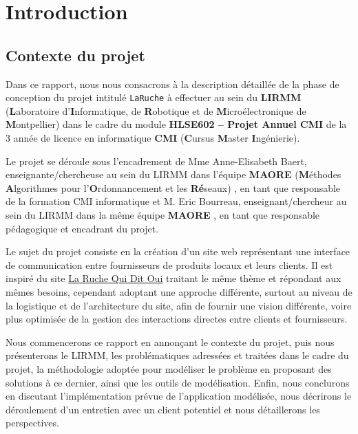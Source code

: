 \documentclass[a4paper,12pt]{report}
\theoremstyle{break}
\theoremstyle{break}
\theoremstyle{break}
\theoremstyle{break}
\theoremstyle{definition}
\theoremstyle{remark}
\begin{document}
\chapter{Introduction}
\setcounter{page}{1}
\section{Contexte du projet}
Dans ce rapport, nous nous consacrons à la description détaillée de la phase de conception du projet intitulé \texttt{LaRuche} à effectuer au sein du \textbf{LIRMM} (\textbf{L}aboratoire d'\textbf{I}nformatique, de \textbf{R}obotique et de \textbf{M}icroélectronique de \textbf{M}ontpellier) dans le cadre du module \textbf{HLSE602 -- Projet Annuel CMI} de la $3$\ieme{} année de licence en informatique \textbf{CMI} (\textbf{C}ursus \textbf{M}aster \textbf{I}ngénierie).

Le projet se déroule sous l'encadrement de Mme Anne-Elisabeth Baert, enseignante/chercheuse au sein du LIRMM dans l'équipe \textbf{MAORE} (\textbf{M}éthodes \textbf{A}lgorithmes pour l'\textbf{O}rdonnancement et les \textbf{Ré}seaux) \citep{AEBPres}, en tant que responsable de la formation CMI informatique et M. Eric Bourreau, enseignant/chercheur au sein du LIRMM dans la même équipe \textbf{MAORE} \citep{EricBourreauPres}, en tant que responsable pédagogique et encadrant du projet.

Le sujet du projet consiste en la création d'un site web représentant une interface de communication entre fournisseurs de produits locaux et leurs clients. Il est inspiré du site \og \href{https://laruchequiditoui.fr/fr}{La Ruche Qui Dit Oui} \fg traitant le même thème et répondant aux mêmes besoins, cependant adoptant une approche différente, surtout au niveau de la logistique et de l'architecture du site, afin de fournir une vision différente, voire plus optimisée de la gestion des interactions directes entre clients et fournisseurs.

Nous commencerons ce rapport en annonçant le contexte du projet, puis nous présenterons le LIRMM, les problématiques adressées et traitées dans le cadre du projet, la méthodologie adoptée pour modéliser le problème en proposant des solutions à ce dernier, ainsi que les outils de modélisation. Enfin, nous conclurons en discutant l'implémentation prévue de l'application modélisée, nous décrirons le déroulement d'un entretien avec un client potentiel et nous détaillerons les perspectives.
\end{document}
